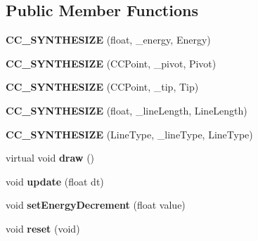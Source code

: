 \subsection*{Public Member Functions}
\begin{DoxyCompactItemize}
\item 
\hypertarget{class_j_g___temp_line_container_a76d934621da27e6655c82fa3f47367fb}{{\bfseries C\-C\-\_\-\-S\-Y\-N\-T\-H\-E\-S\-I\-Z\-E} (float, \-\_\-energy, Energy)}\label{class_j_g___temp_line_container_a76d934621da27e6655c82fa3f47367fb}

\item 
\hypertarget{class_j_g___temp_line_container_a000b563cdf4514db05690c6a5a58bf8f}{{\bfseries C\-C\-\_\-\-S\-Y\-N\-T\-H\-E\-S\-I\-Z\-E} (C\-C\-Point, \-\_\-pivot, Pivot)}\label{class_j_g___temp_line_container_a000b563cdf4514db05690c6a5a58bf8f}

\item 
\hypertarget{class_j_g___temp_line_container_ac08d97e1c2aec33333af36d4a6bb082a}{{\bfseries C\-C\-\_\-\-S\-Y\-N\-T\-H\-E\-S\-I\-Z\-E} (C\-C\-Point, \-\_\-tip, Tip)}\label{class_j_g___temp_line_container_ac08d97e1c2aec33333af36d4a6bb082a}

\item 
\hypertarget{class_j_g___temp_line_container_aec49e4d98621fc93f88c86a0d8c9106f}{{\bfseries C\-C\-\_\-\-S\-Y\-N\-T\-H\-E\-S\-I\-Z\-E} (float, \-\_\-line\-Length, Line\-Length)}\label{class_j_g___temp_line_container_aec49e4d98621fc93f88c86a0d8c9106f}

\item 
\hypertarget{class_j_g___temp_line_container_abeee2ee1f80e70f392d9565221da2312}{{\bfseries C\-C\-\_\-\-S\-Y\-N\-T\-H\-E\-S\-I\-Z\-E} (Line\-Type, \-\_\-line\-Type, Line\-Type)}\label{class_j_g___temp_line_container_abeee2ee1f80e70f392d9565221da2312}

\item 
\hypertarget{class_j_g___temp_line_container_a36203326958031be1c0ff7a3cc61d2eb}{virtual void {\bfseries draw} ()}\label{class_j_g___temp_line_container_a36203326958031be1c0ff7a3cc61d2eb}

\item 
\hypertarget{class_j_g___temp_line_container_a3fd0208929faccbff7e44ed5bfdad197}{void {\bfseries update} (float dt)}\label{class_j_g___temp_line_container_a3fd0208929faccbff7e44ed5bfdad197}

\item 
\hypertarget{class_j_g___temp_line_container_a92c74cc9ad1a56fb2b974b2eaa93d2f9}{void {\bfseries set\-Energy\-Decrement} (float value)}\label{class_j_g___temp_line_container_a92c74cc9ad1a56fb2b974b2eaa93d2f9}

\item 
\hypertarget{class_j_g___temp_line_container_aad9a9bee32831fff0cb4b03877616913}{void {\bfseries reset} (void)}\label{class_j_g___temp_line_container_aad9a9bee32831fff0cb4b03877616913}

\end{DoxyCompactItemize}
